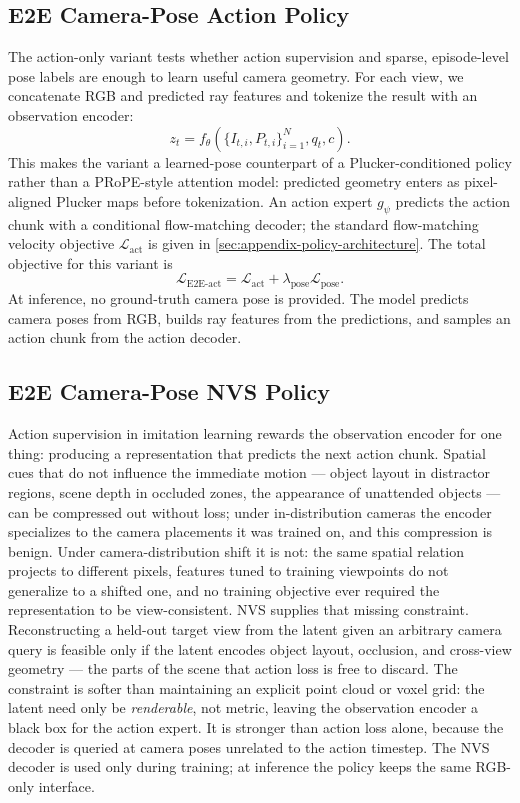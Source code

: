 \subsection{E2E Camera-Pose Action Policy}

The action-only variant tests whether action supervision and sparse,
episode-level pose labels are enough to learn useful camera geometry.  For each
view, we concatenate RGB and predicted ray features and tokenize the result with
an observation encoder:
\begin{equation}
z_t = f_\theta\left(\{I_{t,i}, P_{t,i}\}_{i=1}^{N}, q_t, c\right).
\end{equation}
This makes the variant a learned-pose counterpart of a Plucker-conditioned
policy rather than a PRoPE-style attention model: predicted geometry enters as
pixel-aligned Plucker maps before tokenization.
An action expert \(g_\psi\) predicts the action chunk with a conditional
flow-matching decoder; the standard flow-matching velocity objective
\(\mathcal{L}_{\text{act}}\) is given in
\autoref{sec:appendix-policy-architecture}.
The total objective for this variant is
\begin{equation}
\mathcal{L}_{\text{E2E-act}} =
\mathcal{L}_{\text{act}}+\lambda_{\text{pose}}\mathcal{L}_{\text{pose}}.
\end{equation}
At inference, no ground-truth camera pose is provided.  The model predicts
camera poses from RGB, builds ray features from the predictions, and samples an
action chunk from the action decoder.

\subsection{E2E Camera-Pose NVS Policy}

Action supervision in imitation learning rewards the observation encoder for one thing: producing a representation that predicts the next action chunk. Spatial cues that do not influence the immediate motion --- object layout in distractor regions, scene depth in occluded zones, the appearance of unattended objects --- can be compressed out without loss; under in-distribution cameras the encoder specializes to the camera placements it was trained on, and this compression is benign. Under camera-distribution shift it is not: the same spatial relation projects to different pixels, features tuned to training viewpoints do not generalize to a shifted one, and no training objective ever required the representation to be view-consistent. NVS supplies that missing constraint. Reconstructing a held-out target view from the latent given an arbitrary camera query is feasible only if the latent encodes object layout, occlusion, and cross-view geometry --- the parts of the scene that action loss is free to discard. The constraint is softer than maintaining an explicit point cloud or voxel grid: the latent need only be \emph{renderable}, not metric, leaving the observation encoder a black box for the action expert. It is stronger than action loss alone, because the decoder is queried at camera poses unrelated to the action timestep. The NVS decoder is used only during training; at inference the policy keeps the same RGB-only interface.

